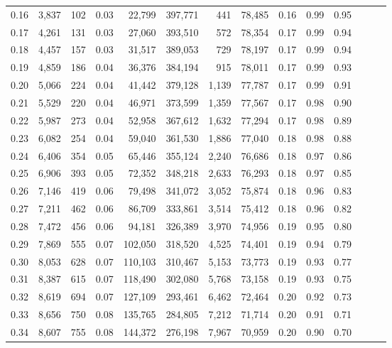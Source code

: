 \begin{tabular}{rrrrrrrrrrrrrr}
0.16 &  3,837 &    102 &  0.03 &   22,799 &  397,771 &     441 &  78,485 &  0.16 &  0.99 &      0.95 \\
0.17 &  4,261 &    131 &  0.03 &   27,060 &  393,510 &     572 &  78,354 &  0.17 &  0.99 &      0.94 \\
0.18 &  4,457 &    157 &  0.03 &   31,517 &  389,053 &     729 &  78,197 &  0.17 &  0.99 &      0.94 \\
0.19 &  4,859 &    186 &  0.04 &   36,376 &  384,194 &     915 &  78,011 &  0.17 &  0.99 &      0.93 \\
0.20 &  5,066 &    224 &  0.04 &   41,442 &  379,128 &   1,139 &  77,787 &  0.17 &  0.99 &      0.91 \\
0.21 &  5,529 &    220 &  0.04 &   46,971 &  373,599 &   1,359 &  77,567 &  0.17 &  0.98 &      0.90 \\
0.22 &  5,987 &    273 &  0.04 &   52,958 &  367,612 &   1,632 &  77,294 &  0.17 &  0.98 &      0.89 \\
0.23 &  6,082 &    254 &  0.04 &   59,040 &  361,530 &   1,886 &  77,040 &  0.18 &  0.98 &      0.88 \\
0.24 &  6,406 &    354 &  0.05 &   65,446 &  355,124 &   2,240 &  76,686 &  0.18 &  0.97 &      0.86 \\
0.25 &  6,906 &    393 &  0.05 &   72,352 &  348,218 &   2,633 &  76,293 &  0.18 &  0.97 &      0.85 \\
0.26 &  7,146 &    419 &  0.06 &   79,498 &  341,072 &   3,052 &  75,874 &  0.18 &  0.96 &      0.83 \\
0.27 &  7,211 &    462 &  0.06 &   86,709 &  333,861 &   3,514 &  75,412 &  0.18 &  0.96 &      0.82 \\
0.28 &  7,472 &    456 &  0.06 &   94,181 &  326,389 &   3,970 &  74,956 &  0.19 &  0.95 &      0.80 \\
0.29 &  7,869 &    555 &  0.07 &  102,050 &  318,520 &   4,525 &  74,401 &  0.19 &  0.94 &      0.79 \\
0.30 &  8,053 &    628 &  0.07 &  110,103 &  310,467 &   5,153 &  73,773 &  0.19 &  0.93 &      0.77 \\
0.31 &  8,387 &    615 &  0.07 &  118,490 &  302,080 &   5,768 &  73,158 &  0.19 &  0.93 &      0.75 \\
0.32 &  8,619 &    694 &  0.07 &  127,109 &  293,461 &   6,462 &  72,464 &  0.20 &  0.92 &      0.73 \\
0.33 &  8,656 &    750 &  0.08 &  135,765 &  284,805 &   7,212 &  71,714 &  0.20 &  0.91 &      0.71 \\
0.34 &  8,607 &    755 &  0.08 &  144,372 &  276,198 &   7,967 &  70,959 &  0.20 &  0.90 &      0.70 \\

\end{tabular}
